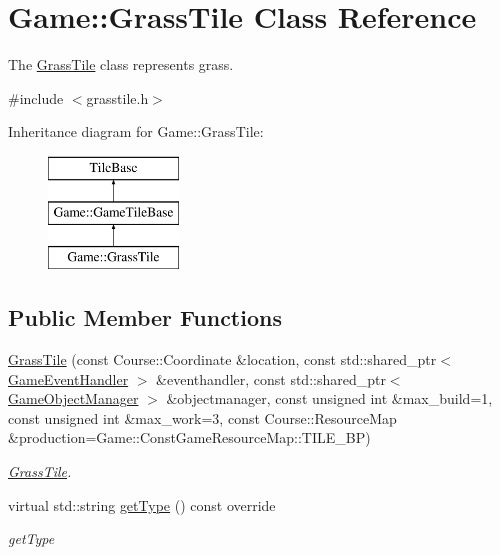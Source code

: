 \hypertarget{class_game_1_1_grass_tile}{\section{Game\-:\-:Grass\-Tile Class Reference}
\label{class_game_1_1_grass_tile}
}


The \hyperlink{class_game_1_1_grass_tile}{Grass\-Tile} class represents grass.  




{\ttfamily \#include $<$grasstile.\-h$>$}

Inheritance diagram for Game\-:\-:Grass\-Tile\-:\begin{figure}[H]
\begin{center}
\leavevmode
\includegraphics[height=3.000000cm]{class_game_1_1_grass_tile}
\end{center}
\end{figure}
\subsection*{Public Member Functions}
\begin{DoxyCompactItemize}
\item 
\hyperlink{class_game_1_1_grass_tile_ae24ddbbcf79256432c521b6ebcf7deee}{Grass\-Tile} (const Course\-::\-Coordinate \&location, const std\-::shared\-\_\-ptr$<$ \hyperlink{class_game_1_1_game_event_handler}{Game\-Event\-Handler} $>$ \&eventhandler, const std\-::shared\-\_\-ptr$<$ \hyperlink{class_game_1_1_game_object_manager}{Game\-Object\-Manager} $>$ \&objectmanager, const unsigned int \&max\-\_\-build=1, const unsigned int \&max\-\_\-work=3, const Course\-::\-Resource\-Map \&production=Game\-::\-Const\-Game\-Resource\-Map\-::\-T\-I\-L\-E\-\_\-\-B\-P)
\begin{DoxyCompactList}\small\item\em \hyperlink{class_game_1_1_grass_tile}{Grass\-Tile}. \end{DoxyCompactList}\item 
virtual std\-::string \hyperlink{class_game_1_1_grass_tile_aeea563297cc6ed020eda6c252e906e1d}{get\-Type} () const override
\begin{DoxyCompactList}\small\item\em get\-Type \end{DoxyCompactList}\end{DoxyCompactItemize}
